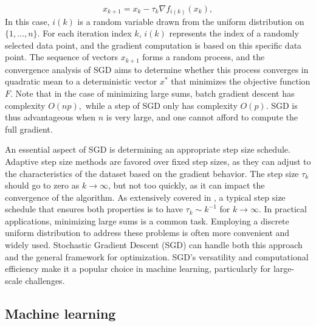 \begin{equation*}\label{SGD_update}\tag{4.4.4}
x_{k+1} = x_k - \tau_k \nabla f_{i(k)}(x_k),
\end{equation*}
In this case, $i(k)$ is a random variable drawn from the uniform distribution on $\{1, \ldots, n\}$. For each iteration index $k$, $i(k)$ represents the index of a randomly selected data point, and the gradient computation is based on this specific data point. The sequence of vectors $x_{k+1}$ forms a random process, and the convergence analysis of SGD aims to determine whether this process converges in quadratic mean to a deterministic vector $x^*$ that minimizes the objective function $F$. Note that in the case of minimizing large sums, batch gradient descent has complexity $O(np),$ while a step of SGD only has complexity $O(p).$ SGD is thus advantageous when $n$ is very large, and one cannot afford to compute the full gradient.


An essential aspect of SGD is determining an appropriate step size schedule. Adaptive step size methods are favored over fixed step sizes, as they can adjust to the characteristics of the dataset based on the gradient behavior. The step size $\tau_k$ should go to zero as $k \rightarrow \infty$, but not too quickly, as it can impact the convergence of the algorithm. As extensively covered in \cite[9-11]{murata}, a typical step size schedule that ensures both properties is to have $\tau_k \sim k^{-1}$ for $k \rightarrow \infty$. In practical applications, minimizing large sums is a common task. Employing a discrete uniform distribution to address these problems is often more convenient and widely used. Stochastic Gradient Descent (SGD) can handle both this approach and the general framework for optimization. SGD's versatility and computational efficiency make it a popular choice in machine learning, particularly for large-scale challenges.


\subsection{Machine learning}
